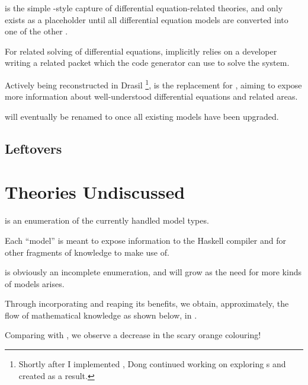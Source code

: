 \DEModel{} is the simple \RelationConcept{}-style capture of differential
equation-related theories, and only exists as a placeholder until all
differential equation models are converted into one of the other \ModelKinds{}.

For related solving of differential equations, \DEModel{} implicitly relies on a
developer writing a related \ODEInfo{} packet which
the code generator can use to solve the system.

Actively being reconstructed in Drasil \cite{Chen2022MEng} \footnote{Shortly
after I implemented \ModelKind{}, Dong continued working on exploring
\DEModel{}s and created \NewDEModel{} as a result.}, \NewDEModel{} is the
replacement for \DEModel{}, aiming to expose more information about
well-understood differential equations and related areas.

\NewDEModel{} will eventually be renamed to \DEModel{} once all existing
\DEModel{} models have been upgraded.


\subsection{Leftovers}


\section{Theories Undiscussed}

\ModelKinds{} is an enumeration of the currently handled model types.

Each ``model'' is meant to expose information to the Haskell compiler and for
other fragments of knowledge to make use of.

\ModelKinds{} is obviously an incomplete enumeration, and will grow as the need
for more kinds of models arises.

Through incorporating \ModelKinds{} and reaping its benefits, we obtain,
approximately, the flow of mathematical knowledge as shown below, in
.

\theoriesWithModelKinds{}

Comparing  with , we
observe a decrease in the scary orange colouring!

